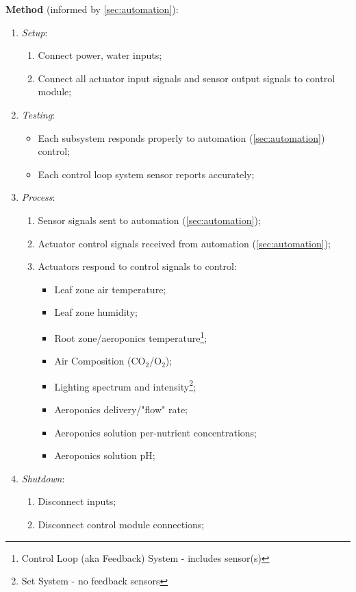\documentclass{report}
\begin{document}
\textbf{Method} (informed by \ref{sec:automation}):
\begin{enumerate}
    \item \textit{Setup}:
    \begin{enumerate}
        \item Connect power, water inputs;
        \item Connect all actuator input signals and sensor output signals to control module;
    \end{enumerate}
    \item \textit{Testing}:
    \begin{itemize}
        \item Each subsystem responds properly to automation (\ref{sec:automation}) control;
        \item Each control loop system sensor reports accurately;
    \end{itemize}
    \item \textit{Process}:
    \begin{enumerate}
        \item Sensor signals sent to automation (\ref{sec:automation});
        \item Actuator control signals received from automation (\ref{sec:automation});
        \item Actuators respond to control signals to control:
        \begin{itemize}
            \item Leaf zone air temperature\footnotemark[4];
            \item Leaf zone humidity\footnotemark[4];
            \item Root zone/aeroponics temperature\footnote{Control Loop (aka Feedback) System - includes sensor(s)};
            \item Air Composition (CO${}_2$/O${}_2$)\footnotemark[4];
            \item Lighting spectrum and intensity\footnote{Set System - no feedback sensors};
            \item Aeroponics delivery/"flow" rate\footnotemark[5];
            \item Aeroponics solution per-nutrient concentrations\footnotemark[5];
            \item Aeroponics solution pH\footnotemark[5];
        \end{itemize}
    \end{enumerate}
    \item \textit{Shutdown}:
    \begin{enumerate}
        \item Disconnect inputs;
        \item Disconnect control module connections;
    \end{enumerate}
\end{enumerate}
\end{document}
